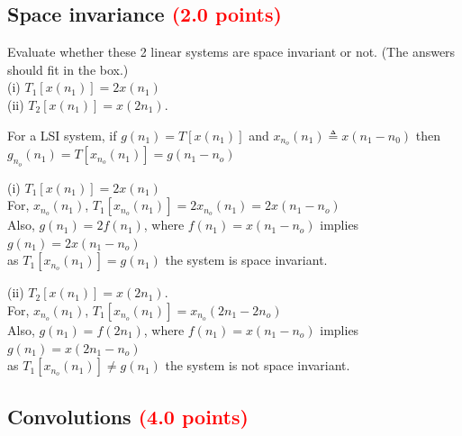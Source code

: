 \documentclass[answers]{exam}
\newcommand{\mypoints}[1]{\textcolor{red}{(#1 points)}}
\begin{document}
\subsection{ Space invariance \mypoints{2.0}}\label{sssec:Space_Invariance}
Evaluate whether these 2 linear systems are space invariant or not. (The answers should fit in the box.) \\
(i) $T_1[x(n_1)] = 2x(n_1)$ \\
(ii) $T_2[x(n_1)] = x(2n_1)$. 
\begin{solution}

For a LSI system, if $g(n_1) = T[x(n_1)]$ and $x_{n_o}(n_1) \triangleq x(n_1-n_0)$ then\\
$g_{n_o}(n_1) = T[x_{n_o}(n_1)] = g(n_1 - n_o)$

(i) $T_1[x(n_1)] = 2x(n_1)$ \\
For, $x_{n_o}(n_1)$, $T_1[x_{n_o}(n_1)] = 2x_{n_o}(n_1) = 2x(n_1 - n_o)$\\
Also, $g(n_1) = 2f(n_1)$, where $f(n_1) = x(n_1 - n_o)$ implies $g(n_1) = 2x(n_1 - n_o)$ \\
as $T_1[x_{n_o}(n_1)] = g(n_1)$ the system is space invariant.

(ii) $T_2[x(n_1)] = x(2n_1)$.\\
For, $x_{n_o}(n_1)$, $T_1[x_{n_o}(n_1)] = x_{n_o}(2n_1 - 2n_o)$\\
Also, $g(n_1) = f(2n_1)$, where $f(n_1) = x(n_1 - n_o)$ implies $g(n_1) = x(2n_1 - n_o)$ \\
as $T_1[x_{n_o}(n_1)] \neq g(n_1)$ the system is not space invariant.
\end{solution}


\subsection{Convolutions \mypoints{4.0}}\label{sssec:Convolutions}
\end{document}
